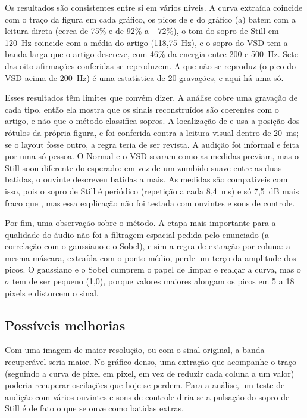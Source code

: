 Os resultados são consistentes entre si em vários níveis. A curva extraída coincide com o traço da figura em cada gráfico, os picos de \Sone{} e \Stwo{} do gráfico (a) batem com a leitura direta (cerca de 75\% e de 92\% a $-72\%$), o tom do sopro de Still em 120~Hz coincide com a média do artigo (118,75~Hz), e o sopro do VSD tem a banda larga que o artigo descreve, com 46\% da energia entre 200 e 500~Hz. Sete das oito afirmações conferidas se reproduzem. A que não se reproduz (o pico do VSD acima de 200~Hz) é uma estatística de 20 gravações, e aqui há uma só.

Esses resultados têm limites que convém dizer. A análise cobre uma gravação de cada tipo, então ela mostra que os sinais reconstruídos são coerentes com o artigo, e não que o método classifica sopros. A localização de \Sone{} e \Stwo{} usa a posição dos rótulos da própria figura, e foi conferida contra a leitura visual dentro de 20~ms; se o layout fosse outro, a regra teria de ser revista. A audição foi informal e feita por uma só pessoa. O Normal e o VSD soaram como as medidas previam, mas o Still soou diferente do esperado: em vez de um zumbido suave entre as duas batidas, o ouvinte descreveu batidas a mais. As medidas são compatíveis com isso, pois o sopro de Still é periódico (repetição a cada 8,4~ms) e só 7,5~dB mais fraco que \Sone, mas essa explicação não foi testada com ouvintes e sons de controle.

Por fim, uma observação sobre o método. A etapa mais importante para a qualidade do áudio não foi a filtragem espacial pedida pelo enunciado (a correlação com o gaussiano e o Sobel), e sim a regra de extração por coluna: a mesma máscara, extraída com o ponto médio, perde um terço da amplitude dos picos. O gaussiano e o Sobel cumprem o papel de limpar e realçar a curva, mas o $\sigma$ tem de ser pequeno (1,0), porque valores maiores alongam os picos em 5 a 18 pixels e distorcem o sinal.

\subsection{Possíveis melhorias}

Com uma imagem de maior resolução, ou com o sinal original, a banda recuperável seria maior. No gráfico denso, uma extração que acompanhe o traço (seguindo a curva de pixel em pixel, em vez de reduzir cada coluna a um valor) poderia recuperar oscilações que hoje se perdem. Para a análise, um teste de audição com vários ouvintes e sons de controle diria se a pulsação do sopro de Still é de fato o que se ouve como batidas extras.
